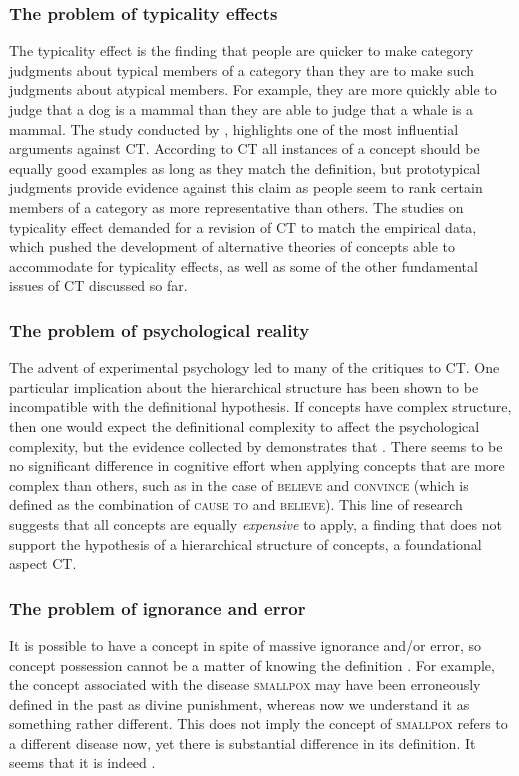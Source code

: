 \subsubsection*{The problem of typicality effects}
The typicality effect is the finding that people are quicker to make category judgments about typical members of a category than they are to make such judgments about atypical members. For example, they are more quickly able to judge that a dog is a mammal than they are able to judge that a whale is a mammal. The study conducted by \cite{Rosch1975}, highlights one of the most influential arguments against CT. According to CT all instances of a concept should be equally good examples as long as they match the definition, but prototypical judgments provide evidence against this claim as people seem to rank certain members of a category as more representative than others. The studies on typicality effect demanded for a revision of CT to match the empirical data, which pushed the development of alternative theories of concepts able to accommodate for typicality effects, as well as some of the other fundamental issues of CT discussed so far.

\subsubsection*{The problem of psychological reality}
The advent of experimental psychology led to many of the critiques to CT. One particular implication about the hierarchical structure has been shown to be incompatible with the definitional hypothesis. If concepts have complex structure, then one would expect the definitional complexity to affect the psychological complexity, but the evidence collected by \cite{Foss1969} demonstrates that . There seems to be no significant difference in cognitive effort when applying concepts that are more complex than others, such as in the case of \textsc{believe} and \textsc{convince} (which is defined as the combination of \textsc{cause to} and \textsc{believe}). This line of research suggests that all concepts are equally \emph{expensive} to apply, a finding that does not support the hypothesis of a hierarchical structure of concepts, a foundational aspect CT.

\subsubsection*{The problem of ignorance and error}
It is possible to have a concept in spite of massive ignorance and/or error, so concept possession cannot be a matter of knowing the definition \citep{Kripke1980,Putnam1970,Putnam1975}. For example, the concept associated with the disease \textsc{smallpox} may have been erroneously defined in the past as divine punishment, whereas now we understand it as something rather different. This does not imply the concept of \textsc{smallpox} refers to a different disease now, yet there is substantial difference in its definition. It seems that it is indeed .

